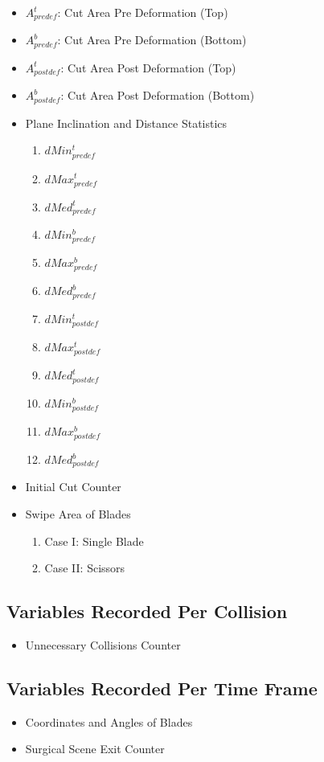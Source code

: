 \begin{itemize}[\tiny$\blacksquare$]
  \item $A^t_{predef}$: Cut Area Pre Deformation (Top)
  \item $A^b_{predef}$: Cut Area Pre Deformation (Bottom)
  \item $A^t_{postdef}$: Cut Area Post Deformation (Top)
  \item $A^b_{postdef}$: Cut Area Post Deformation (Bottom)
  \item Plane Inclination and Distance Statistics
	  \begin{enumerate}[1.]
	    \item $dMin_{predef}^t$
	    \item $dMax_{predef}^t$
	    \item $dMed_{predef}^t$
	    \item $dMin_{predef}^b$
	    \item $dMax_{predef}^b$
	    \item $dMed_{predef}^b$
	    \item $dMin_{postdef}^t$
	    \item $dMax_{postdef}^t$
	    \item $dMed_{postdef}^t$
	    \item $dMin_{postdef}^b$
	    \item $dMax_{postdef}^b$
	    \item $dMed_{postdef}^b$
	  \end{enumerate}
  \item Initial Cut Counter
  \item Swipe Area of Blades
  \begin{enumerate}[1.]
	  \item Case I: Single Blade
	  \item Case II: Scissors
  \end{enumerate}
\end{itemize}

\subsection{Variables Recorded Per Collision}
\begin{itemize}[\tiny$\blacksquare$]
  \item Unnecessary Collisions Counter
\end{itemize}

\subsection{Variables Recorded Per Time Frame}
\begin{itemize}[\tiny$\blacksquare$]
  \item Coordinates and Angles of Blades
  \item Surgical Scene Exit Counter
\end{itemize}

